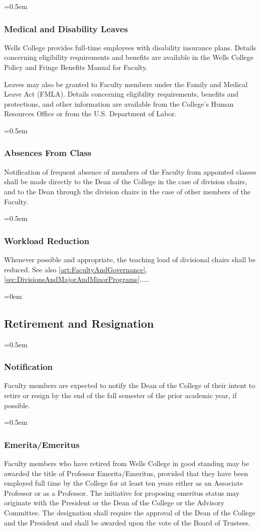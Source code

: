 \documentclass{manual}
\let\oldsubsection\subsection
\renewcommand\subsection{\leftskip=0em\oldsubsection}
\let\oldsubsubsection\subsubsection
\renewcommand\subsubsection{\leftskip=0.5em\oldsubsubsection}
\begin{document}
		\subsubsection{Medical and Disability Leaves}
		Wells College provides full-time employees with disability insurance plans. Details concerning eligibility requirements and benefits are available in the Wells College Policy and Fringe Benefits Manual for Faculty.

			Leaves may also be granted to Faculty members under the Family and Medical Leave Act (FMLA). Details concerning eligibility requirements, benefits and protections, and other information are available from the College's Human Resources Office or from the U.S. Department of Labor.

		\subsubsection{Absences From Class}
		Notification of frequent absence of members of the Faculty from appointed classes shall be made directly to the Dean of the College in the case of division chairs, and to the Dean through the division chairs in the case of other members of the Faculty.

		\subsubsection{Workload Reduction} \label{sub:WorkloadReduction}
		Whenever possible and appropriate, the teaching load of divisional chairs shall be reduced. See also \cref{art:FacultyAndGovernance}, \cref{sec:DivisionsAndMajorAndMinorPrograms}.....

	\subsection{Retirement and Resignation}

		\subsubsection{Notification}
		Faculty members are expected to notify the Dean of the College of their intent to retire or resign by the end of the fall semester of the prior academic year, if possible.

		\subsubsection{Emerita/Emeritus}
		Faculty members who have retired from Wells College in good standing may be awarded the title of Professor Emerita/Emeritus, provided that they have been employed full time by the College for at least ten years either as an Associate Professor or as a Professor. The initiative for proposing emeritus status may originate with the President or the Dean of the College or the Advisory Committee. The designation shall require the approval of the Dean of the College and the President and shall be awarded upon the vote of the Board of Trustees.
\end{document}
